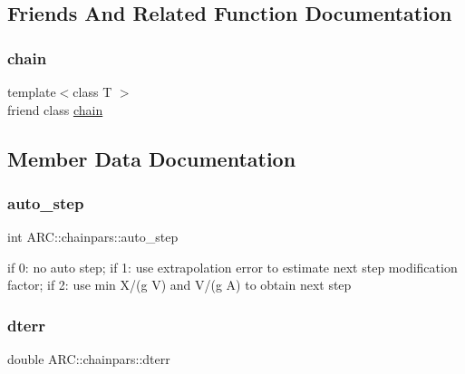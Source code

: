 \subsection{Friends And Related Function Documentation}
\hypertarget{classARC_1_1chainpars_a498fbb4337b9878a5f0044996e4a2489}{}\label{classARC_1_1chainpars_a498fbb4337b9878a5f0044996e4a2489} 
\subsubsection{\texorpdfstring{chain}{chain}}
{\footnotesize\ttfamily template$<$class T $>$ \\
friend class \hyperlink{classARC_1_1chain}{chain}\hspace{0.3cm}{\ttfamily [friend]}}



\subsection{Member Data Documentation}
\hypertarget{classARC_1_1chainpars_a9fc7b9a8ce26c24cf95f53bdc80924c7}{}\label{classARC_1_1chainpars_a9fc7b9a8ce26c24cf95f53bdc80924c7} 
\subsubsection{\texorpdfstring{auto\+\_\+step}{auto\_step}}
{\footnotesize\ttfamily int A\+R\+C\+::chainpars\+::auto\+\_\+step}



if 0\+: no auto step; if 1\+: use extrapolation error to estimate next step modification factor; if 2\+: use min X/(g V) and V/(g A) to obtain next step 

\hypertarget{classARC_1_1chainpars_ad3a3e8f9199180ec82b9c257b1e8570e}{}\label{classARC_1_1chainpars_ad3a3e8f9199180ec82b9c257b1e8570e} 
\subsubsection{\texorpdfstring{dterr}{dterr}}
{\footnotesize\ttfamily double A\+R\+C\+::chainpars\+::dterr}



